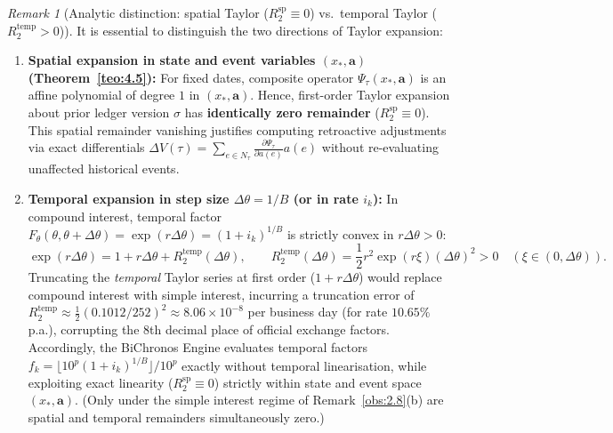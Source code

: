 \documentclass[11pt, a4paper]{article}
\theoremstyle{definition}
\theoremstyle{plain}
\theoremstyle{remark}
\newtheorem{observacao}[definicao]{Remark}
\begin{document}
\begin{observacao}[Analytic distinction: spatial Taylor (\texorpdfstring{$R_2^{\text{sp}} \equiv 0$}{R2_sp = 0}) vs.\ temporal Taylor (\texorpdfstring{$R_2^{\text{temp}} > 0$}{R2_temp > 0})]\label{obs:4.6}
It is essential to distinguish the two directions of Taylor expansion:
\begin{enumerate}[label=(\alph*)]
    \item \textbf{Spatial expansion in state and event variables $(x_*, \mathbf{a})$ (Theorem~\ref{teo:4.5}):} For fixed dates, composite operator $\Psi_\tau(x_*, \mathbf{a})$ is an affine polynomial of degree $1$ in $(x_*, \mathbf{a})$. Hence, first-order Taylor expansion about prior ledger version $\sigma$ has \textbf{identically zero remainder} ($R_2^{\text{sp}} \equiv 0$). This spatial remainder vanishing justifies computing retroactive adjustments via exact differentials $\Delta V(\tau) = \sum_{e \in N_\tau} \frac{\partial \Psi_\tau}{\partial a(e)} a(e)$ without re-evaluating unaffected historical events.
    \item \textbf{Temporal expansion in step size $\Delta\theta = 1/B$ (or in rate $i_k$):} In compound interest, temporal factor $F_\theta(\theta, \theta + \Delta\theta) = \exp(r\Delta\theta) = (1 + i_k)^{1/B}$ is strictly convex in $r\Delta\theta > 0$:
    \[
    \exp(r\Delta\theta) = 1 + r\Delta\theta + R_2^{\text{temp}}(\Delta\theta), \qquad R_2^{\text{temp}}(\Delta\theta) = \frac{1}{2}r^2 \exp(r\xi)(\Delta\theta)^2 > 0 \quad (\xi \in (0, \Delta\theta)).
    \]
    Truncating the \emph{temporal} Taylor series at first order ($1 + r\Delta\theta$) would replace compound interest with simple interest, incurring a truncation error of $R_2^{\text{temp}} \approx \frac{1}{2}(0.1012 / 252)^2 \approx 8.06 \times 10^{-8}$ per business day (for rate $10.65\%$ p.a.), corrupting the 8th decimal place of official exchange factors. Accordingly, the BiChronos Engine evaluates temporal factors $f_k = \lfloor 10^p(1+i_k)^{1/B}\rfloor/10^p$ exactly without temporal linearisation, while exploiting exact linearity ($R_2^{\text{sp}} \equiv 0$) strictly within state and event space $(x_*, \mathbf{a})$. (Only under the simple interest regime of Remark~\ref{obs:2.8}(b) are spatial and temporal remainders simultaneously zero.)
\end{enumerate}
\end{observacao}
\end{document}
